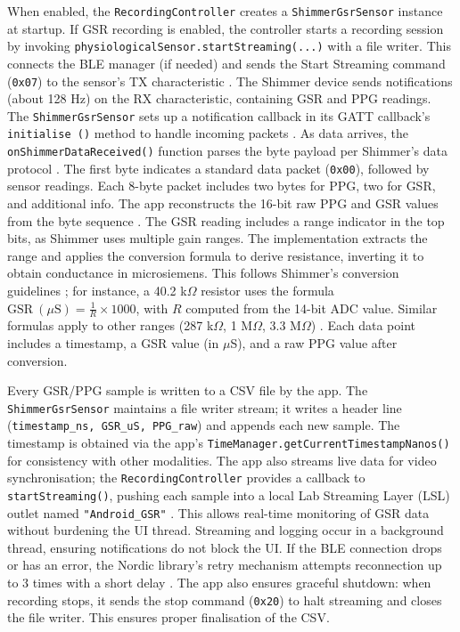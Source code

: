 When enabled, the \texttt{RecordingController} creates a \texttt{ShimmerGsrSensor} instance at startup. If GSR recording is enabled, the controller starts a recording session by invoking \texttt{physiologicalSensor.startStreaming(...)} with a file writer. This connects the BLE manager (if needed) and sends the Start Streaming command (\texttt{0x07}) to the sensor's TX characteristic \cite{ref15}. The Shimmer device sends notifications (about 128 Hz) on the RX characteristic, containing GSR and PPG readings. The \texttt{ShimmerGsrSensor} sets up a notification callback in its GATT callback's \texttt{initialise ()} method to handle incoming packets \cite{ref15}. As data arrives, the \texttt{onShimmerDataReceived()} function parses the byte payload per Shimmer's data protocol \cite{ref8}. The first byte indicates a standard data packet (\texttt{0x00}), followed by sensor readings. Each 8-byte packet includes two bytes for PPG, two for GSR, and additional info. The app reconstructs the 16-bit raw PPG and GSR values from the byte sequence \cite{ref8}. The GSR reading includes a range indicator in the top bits, as Shimmer uses multiple gain ranges. The implementation extracts the range and applies the conversion formula to derive resistance, inverting it to obtain conductance in microsiemens. This follows Shimmer's conversion guidelines \cite{ref8}; for instance, a 40.2 k$\Omega$ resistor uses the formula $\mathrm{GSR}\ (\mu\mathrm{S}) = \frac{1}{R} \times 1000$, with $R$ computed from the 14-bit ADC value. Similar formulas apply to other ranges (287 k$\Omega$, 1 M$\Omega$, 3.3 M$\Omega$) \cite{ref8}. Each data point includes a timestamp, a GSR value (in $\mu$S), and a raw PPG value after conversion.

Every GSR/PPG sample is written to a CSV file by the app. The \texttt{ShimmerGsrSensor} maintains a file writer stream; it writes a header line (\texttt{timestamp\_ns, GSR\_uS, PPG\_raw}) and appends each new sample. The timestamp is obtained via the app's \texttt{TimeManager.getCurrentTimestampNanos()} for consistency with other modalities. The app also streams live data for video synchronisation; the \texttt{RecordingController} provides a callback to \texttt{startStreaming()}, pushing each sample into a local Lab Streaming Layer (LSL) outlet named \texttt{"Android\_GSR"} \cite{ref9}. This allows real-time monitoring of GSR data without burdening the UI thread. Streaming and logging occur in a background thread, ensuring notifications do not block the UI. If the BLE connection drops or has an error, the Nordic library's retry mechanism attempts reconnection up to 3 times with a short delay \cite{ref14}. The app also ensures graceful shutdown: when recording stops, it sends the stop command (\texttt{0x20}) to halt streaming \cite{ref15} and closes the file writer. This ensures proper finalisation of the CSV.

